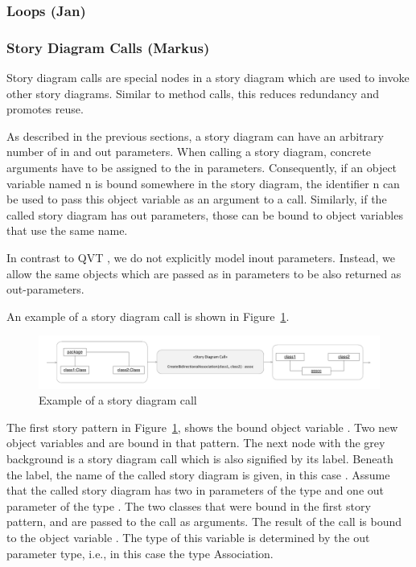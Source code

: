 \subsubsection{Loops (Jan)}

\subsubsection{Story Diagram Calls (Markus)}

Story diagram calls are special nodes in a story diagram which are used to invoke other story diagrams. Similar to method calls, this reduces redundancy and promotes reuse.

As described in the previous sections, a story diagram can have an arbitrary number of in and out parameters. When calling a story diagram, concrete arguments have to be assigned to the in parameters. Consequently, if an object variable named n is bound somewhere in the story diagram, the identifier n can be used to pass this object variable as an argument to a call. Similarly, if the called story diagram has out parameters, those can be bound to object variables that use the same name.

In contrast to QVT \cite{QVT}, we do not explicitly model inout parameters. Instead, we allow the same objects which are passed as in parameters to be also returned as out-parameters.

An example of a story diagram call is shown in Figure~\ref{fig:call}.

\begin{figure}[htb]
\begin{center}
  \includegraphics[width=\textwidth]{figures/StoryDiagramCall}
  \caption{Example of a story diagram call}
  \label{fig:call}
\end{center}
\end{figure}

The first story pattern in Figure~\ref{fig:call}, shows the bound object variable . Two new object variables  and  are bound in that pattern. The next node with the grey background is a story diagram call which is also signified by its label. Beneath the label, the name of the called story diagram is given, in this case . Assume that the called story diagram has two in parameters of the type  and one out parameter of the type . The two classes that were bound in the first story pattern,  and  are passed to the call as arguments.
The result of the call is bound to the object variable . The type of this variable is determined by the out parameter type, i.e., in this case the type Association.

